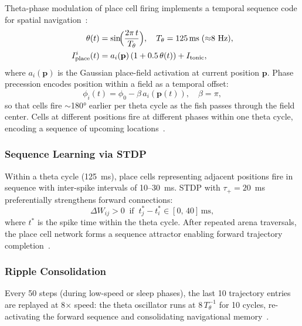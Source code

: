 \documentclass[11pt,a4paper]{article}
\begin{document}
Theta-phase modulation of place cell firing implements a temporal
sequence code for spatial navigation~\cite{okeefe1993,skaggs1996}:
\begin{equation}\label{eq:theta}
\begin{aligned}
  \theta(t) &= \sin\!\Bigl(\frac{2\pi\,t}{T_\theta}\Bigr),
  \quad T_\theta = 125\,\mathrm{ms}\;\text{($\approx$8~Hz)}, \\
  I_\mathrm{place}^i(t) &= a_i(\mathbf{p})\,(1 + 0.5\,\theta(t)) + I_\mathrm{tonic},
\end{aligned}
\end{equation}
where $a_i(\mathbf{p})$ is the Gaussian place-field activation at
current position $\mathbf{p}$.
Phase precession encodes position within a field as a temporal offset:
\begin{equation}\label{eq:precession}
  \phi_i(t) = \phi_0 - \beta\,a_i(\mathbf{p}(t)),
  \quad \beta = \pi,
\end{equation}
so that cells fire $\sim$180° earlier per theta cycle as the fish
passes through the field center.
Cells at different positions fire at different phases within one theta
cycle, encoding a sequence of upcoming locations~\cite{skaggs1996}.

\subsubsection{Sequence Learning via STDP}

Within a theta cycle (125~ms), place cells representing adjacent
positions fire in sequence with inter-spike intervals of 10--30~ms.
STDP with $\tau_+ = 20$~ms preferentially strengthens forward connections:
\begin{equation}
  \Delta W_{ij} > 0 \;\;\text{if}\;\; t_j^* - t_i^* \in [0,\,40]\,\mathrm{ms},
\end{equation}
where $t^*$ is the spike time within the theta cycle.
After repeated arena traversals, the place cell network forms a
sequence attractor enabling forward trajectory completion~\cite{moser2008}.

\subsubsection{Ripple Consolidation}

Every 50 steps (during low-speed or sleep phases), the last 10
trajectory entries are replayed at 8$\times$ speed:
the theta oscillator runs at $8\,T_\theta^{-1}$ for 10 cycles,
re-activating the forward sequence and consolidating navigational
memory~\cite{moser2008,mcnaughton2006}.
\end{document}
